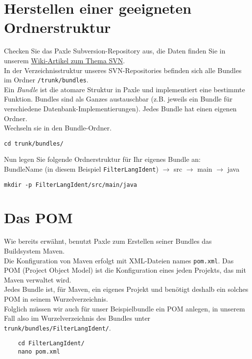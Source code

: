 \documentclass[a4paper,12pt]{scrartcl}
\begin{document}
\section{Herstellen einer geeigneten Ordnerstruktur}
Checken Sie das Paxle Subversion-Repository aus, die Daten finden Sie in unserem \href{http://wiki.paxle.net/project/infrastructure/svn}{Wiki-Artikel zum Thema SVN}.\\
In der Verzeichnisstruktur unseres SVN-Repositories befinden sich alle Bundles im Ordner \lstinline[breaklines=false, basicstyle=\itshape]|/trunk/bundles|.\\
Ein \emph{Bundle} ist die atomare Struktur in Paxle und implementiert eine bestimmte Funktion. Bundles sind als Ganzes austauschbar (z.B. jeweils ein Bundle für verschiedene Datenbank-Implementierungen). Jedes Bundle hat einen eigenen Ordner.\\
Wechseln sie in den Bundle-Ordner.\\
\begin{lstlisting}[caption=Navigation in den passenden Ordner]
	cd trunk/bundles/
\end{lstlisting}
Nun legen Sie folgende Ordnerstruktur für Ihr eigenes Bundle an:\\
BundleName (in diesem Beispiel \lstinline[breaklines=false, basicstyle=\itshape]|FilterLangIdent|) $\rightarrow$ src $\rightarrow$ main $\rightarrow$ java
\begin{lstlisting}[caption=Anlegen der korrekten Ordnerstruktur für ein eigenes Bundle]
	mkdir -p FilterLangIdent/src/main/java
\end{lstlisting}

\section{Das POM}
Wie bereits erwähnt, benutzt Paxle zum Erstellen seiner Bundles das Buildsystem Maven.\\
Die Konfiguration von Maven erfolgt mit XML-Dateien names \lstinline|pom.xml|. Das POM (Project Object Model) ist die Konfiguration eines jeden Projekts, das mit Maven verwaltet wird.\\
Jedes Bundle ist, für Maven, ein eigenes Projekt und benötigt deshalb ein solches POM in seinem Wurzelverzeichnis.\\
Folglich müssen wir auch für unser Beispielbundle ein POM anlegen, in unserem Fall also im Wurzelverzeichnis des Bundles unter \lstinline[breaklines=false, basicstyle=\itshape]|trunk/bundles/FilterLangIdent/|.
\begin{lstlisting}
	cd FilterLangIdent/
	nano pom.xml
\end{lstlisting}
\end{document}
